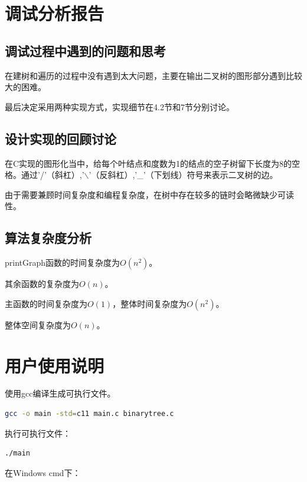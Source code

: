 \documentclass{article}
\begin{document}
\section{调试分析报告}

\subsection{调试过程中遇到的问题和思考}

在建树和遍历的过程中没有遇到太大问题，主要在输出二叉树的图形部分遇到比较大的困难。

最后决定采用两种实现方式，实现细节在4.2节和7节分别讨论。

\subsection{设计实现的回顾讨论}

在C实现的图形化当中，给每个叶结点和度数为1的结点的空子树留下长度为8的空格。通过'/'（斜杠）,'$\backslash$'（反斜杠）,'\_'（下划线）符号来表示二叉树的边。

由于需要兼顾时间复杂度和编程复杂度，在树中存在较多的链时会略微缺少可读性。

\subsection{算法复杂度分析}

printGraph函数的时间复杂度为$O(n^2)$。

其余函数的复杂度为$O(n)$。

主函数的时间复杂度为$O(1)$，整体时间复杂度为$O(n^2)$。

整体空间复杂度为$O(n)$。

\section{用户使用说明}

使用gcc编译生成可执行文件。

\begin{lstlisting}[language={bash},
    basicstyle=\small\consolas]
gcc -o main -std=c11 main.c binarytree.c
\end{lstlisting}

执行可执行文件：

\begin{lstlisting}[language={bash},
    basicstyle=\small\consolas]
./main
\end{lstlisting}

在Windows cmd下：
\end{document}
